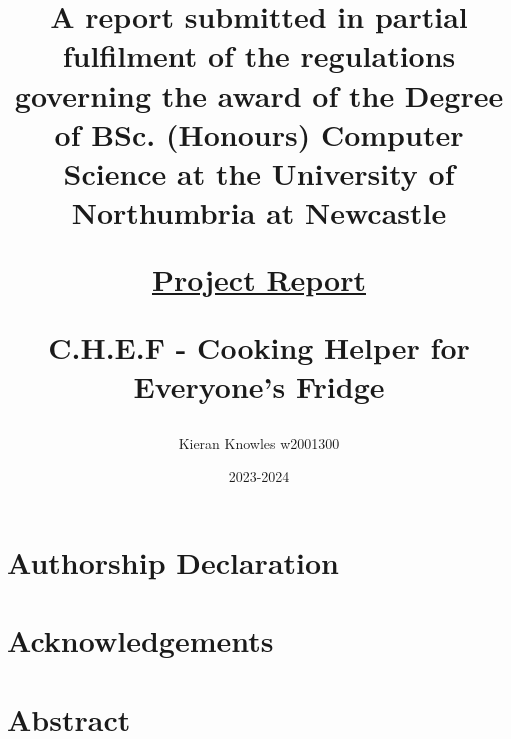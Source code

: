 \documentclass[11pt, twoside, a4paper]{report}
\begin{document}

\title{
    A report submitted in partial fulfilment of the regulations governing the award of the Degree of
    BSc. (Honours) Computer Science at the University of Northumbria at Newcastle

    \underline{Project Report}

    C.H.E.F - Cooking Helper for Everyone's Fridge
}
\author{Kieran Knowles w2001300}
\date{2023-2024}
\maketitle


\chapter*{Authorship Declaration}


\chapter*{Acknowledgements}

\chapter*{Abstract}
\end{document}
